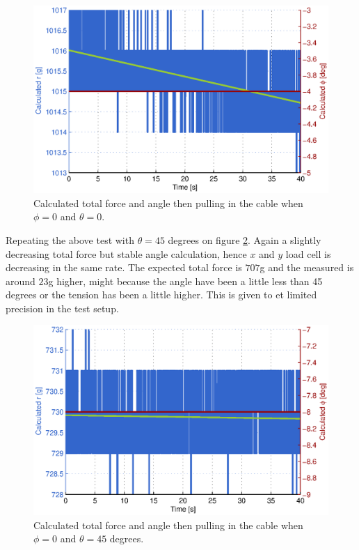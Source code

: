 \begin{figure}[hbtp]
\centering
\includegraphics[scale=1]{graphics/gcs_test/theta0phi0deg1kgCable.eps}
\caption{Calculated total force and angle then pulling in the cable when $\phi=0$ and $\theta=0$.}
\label{fig:theta0phi0deg1kgCable}
\end{figure}

\newpage
\noindent
Repeating the above test with $\theta=45$ degrees on figure \ref{fig:theta45phi0deg1kgCable}. Again a slightly decreasing total force but stable angle calculation, hence $x$ and $y$ load cell is decreasing in the same rate. The expected total force is $707$g and the measured is around $23$g higher, might because the angle have been a little less than 45 degrees or the tension has been a little higher. This is given to et limited precision in the test setup.


\begin{figure}[hbtp]
\centering
\includegraphics[scale=1]{graphics/gcs_test/theta45phi0deg1kgCable.eps}
\caption{Calculated total force and angle then pulling in the cable when $\phi=0$ and $\theta=45$ degrees.}
\label{fig:theta45phi0deg1kgCable}
\end{figure}




